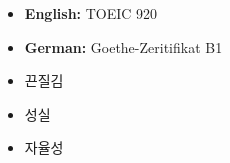 %
%
%

\twocolumnsection
{
\begin{itemize}
    \item \textbf{English: }{TOEIC 920}
	\item \textbf{German: }{Goethe-Zeritifikat B1}
\end{itemize}
}
{
\begin{itemize}
	\item 끈질김 
	\item 성실                 
    \item 자율성
\end{itemize}
}
